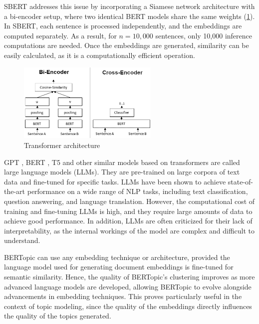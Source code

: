 SBERT addresses this issue by incorporating a Siamese network architecture with a bi-encoder setup, where two identical BERT models share the same weights (\cref{fig:bi_vs_cross}). In SBERT, each sentence is processed independently, and the embeddings are computed separately. As a result, for \( n = 10,000 \) sentences, only 10,000 inference computations are needed. Once the embeddings are generated, similarity can be easily calculated, as it is a computationally efficient operation.

\begin{figure}[h]
    \centering
    \includegraphics[width=0.6\textwidth]{figures/bi_vs_cross.png}
    \caption{Transformer architecture}
    \label{fig:bi_vs_cross}
\end{figure}

GPT \cite{radford_improving_nodate, radford_language_nodate, brown_language_2020}, BERT \cite{devlin_bert_2019}, T5 \cite{raffel_exploring_2020} and other similar models based on transformers are called large language models (LLMs). They are pre-trained on large corpora of text data and fine-tuned for specific tasks. LLMs have been shown to achieve state-of-the-art performance on a wide range of NLP tasks, including text classification, question answering, and language translation. However, the computational cost of training and fine-tuning LLMs is high, and they require large amounts of data to achieve good performance. In addition, LLMs are often criticized for their lack of interpretability, as the internal workings of the model are complex and difficult to understand.

BERTopic can use any embedding technique or architecture, provided the language model used for generating document embeddings is fine-tuned for semantic similarity. Hence, the quality of BERTopic's clustering improves as more advanced language models are developed, allowing BERTopic to evolve alongside advancements in embedding techniques. This proves particularly useful in the context of topic modeling, since the quality of the embeddings directly influences the quality of the topics generated.

